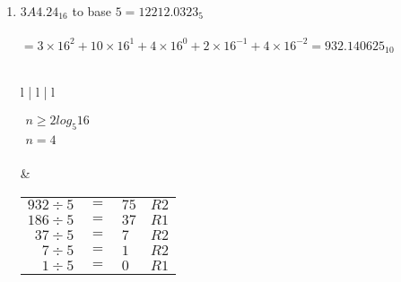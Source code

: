 \documentclass[12pt]{article}
\begin{document}
\begin{enumerate}
\begin{tabular}{l | l | l}
       $\begin{aligned}
           n \geq 2log_{8}13 \\
           n = 3 \\
       \end{aligned}$

       &

       \begin{tabular}{r c l l}
           $602 \div 8$ & $=$ & $75$ & $R2$ \\
           $75 \div 8$  & $=$ & $9$ & $R3$  \\
           $9 \div 8$   & $=$ & $1$ & $R1$  \\
           $1 \div 8$   & $=$ & $0$ & $R1$  \\
       \end{tabular}

       &

       \begin{tabular}{r c l l}
           $8 \times .177514792$ & $=$ & $1 + .420118336$ & \\
           $8 \times .420118336$ & $=$ & $3 + .360946688$ & \\
           $8 \times .360946688$ & $=$ & $2 + .887573504$ & round up \\
       \end{tabular}
       

    \end{tabular}

    \item $3A4.24_{16}$ to base $5 = \boxed{12212.0323_{5}}$ \\ \\
    $ = 3 \times 16^2 + 10 \times 16^1 + 4 \times 16^0 + 2 \times 16^{-1} + 4 \times 16^{-2} = 932.140625_{10}$ \\\\
    \begin{tabular}{l | l | l}
        

       $\begin{aligned}
           n \geq 2log_{5}16 \\
           n = 4 \\
       \end{aligned}$

       &

       \begin{tabular}{r c l l}
           $932 \div 5$ & $=$ & $75$ & $R2$ \\
           $186 \div 5$  & $=$ & $37$ & $R1$  \\
           $37 \div 5$   & $=$ & $7$ & $R2$  \\
           $7 \div 5$   & $=$ & $1$ & $R2$  \\
           $1 \div 5$   & $=$ & $0$ & $R1$  \\
       \end{tabular}


\end{tabular}
\end{enumerate}
\end{document}
